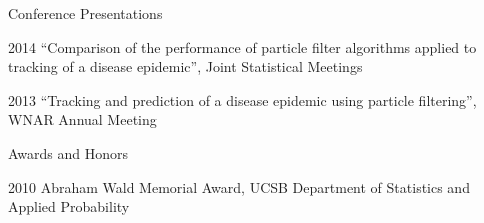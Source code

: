 \begin{vitae}
{      \begin{vitaesection}{Conference Presentations}
        \vspace{-0.1cm}
      \item [2014] ``Comparison of the performance of particle filter algorithms applied to tracking of a disease epidemic'', Joint Statistical Meetings
      \item [2013] ``Tracking and prediction of a disease epidemic using particle filtering'', WNAR Annual Meeting
        \vspace{0.3cm}
      \end{vitaesection}

      \begin{vitaesection}{Awards and Honors}
      \item [2010] Abraham Wald Memorial Award, UCSB Department of Statistics and Applied Probability
        \vspace{-0.1cm}
      \end{vitaesection}
    }
  \end{vitae}
\dsp


